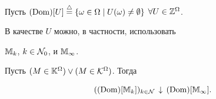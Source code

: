 Пусть $(\Dom)[U]\stac \{\omega \in \Omega \mid


U(\omega) \ne \emptyset\}$ $\forall{U} \in {{\Bbb Z}^\Omega}$.


В качестве $U$ можно, в частности, использовать


${{\Bbb M}_k}$, $k \in {{\cal N}_0}$, и ${\Bbb M}_\infty$.





\begin{thms}


Пусть $(M \in {{\Bbb K}^\Omega}) \vee (M \in


{{\cal K}^\Omega})$. Тогда


$$


((\Dom)[{\Bbb M}_k])_{k \in {\cal N}}\,\downarrow\,(\Dom)[{\Bbb M}_\infty].


$$


\end{thms}





